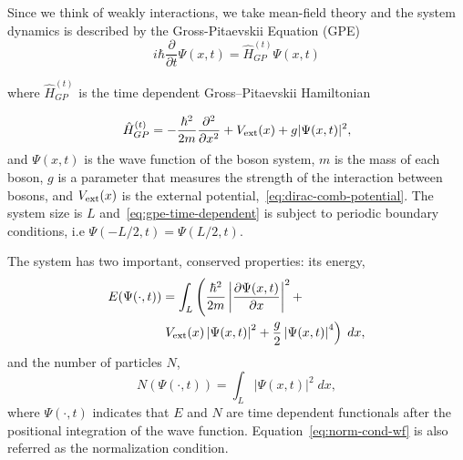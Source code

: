 \documentclass[twocolumn,showpacs,showkeys,preprintnumbers,superscriptaddress, pra, 10pt, aps]{revtex4-2}
\begin{document}
Since we think of weakly interactions, we take mean-field theory and the system dynamics is described by the Gross-Pitaevskii Equation (GPE)~\cite{Stringari}
%
\begin{equation}
  \label{eq:gpe-time-dependent}
  i \hbar \frac{\partial}{\partial t} \Psi(x, t) = \hat{H}_{GP}^{(t)} \Psi(x, t)
\end{equation}

where ${\hat{H}}_{GP}^{(t)}$ is the time dependent Gross–Pitaevskii Hamiltonian

\begin{equation}
  \label{eq:gp-equation}
  {\hat{H}}_{GP}^{(t)} =- \frac{\hbar^2}{2m} \frac{\partial^2}{\partial x^2} + V_\mathrm{ext}(x) + g |\Psi(x, t)|^2,
\end{equation}
%
and $\Psi(x, t)$ is the wave function of the boson system, $m$ is the mass of each boson, $g$ is a
parameter that measures the strength of the interaction between bosons, and $V_\mathrm{ext}(x)$ is
the external potential,~\eqref{eq:dirac-comb-potential}. The system size is $L$ and~\eqref{eq:gpe-time-dependent} is subject to periodic boundary conditions, i.e $\Psi(-L/2, t)= \Psi(L/2, t)$.

The system has two important, conserved properties: its  energy,
%
\begin{align}
  E(\Psi(\cdot, t)) & = \int_L \left( \frac{\hbar^2}{2m} \left|\frac{\partial \Psi(x, t)}{\partial x} \right|^2 + \right. \nonumber \\
                    & \left. V_\mathrm{ext}(x)\left|\Psi(x, t)\right|^2 + \frac{g}{2}\left|\Psi(x, t) \right|^4 \right) \; dx,
  \label{eq:system-energy}
\end{align}
%
and the number of particles $N$,
%
\begin{equation}
  \label{eq:norm-cond-wf}
  N(\Psi(\cdot, t)) = \int_L \left| \Psi(x, t) \right|^2 \; dx,
\end{equation}
%
where $\Psi(\cdot,t)$ indicates that $E$ and $N$ are time dependent functionals after the positional integration of the wave function. %
%
Equation~\eqref{eq:norm-cond-wf} is also referred as the normalization condition.
\end{document}
